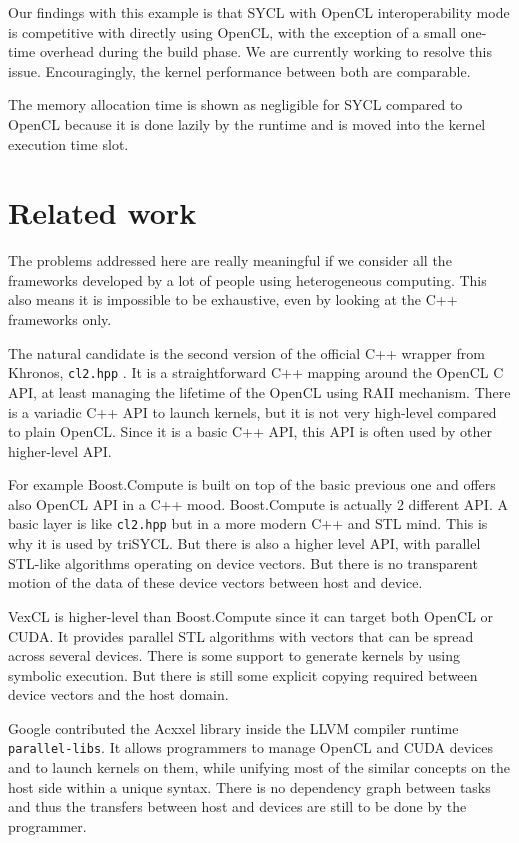 \documentclass[sigplan, review, authordraft]{acmart}
\begin{document}
Our findings with this example is that SYCL with OpenCL interoperability mode is competitive with directly using OpenCL, with the exception of a small one-time overhead during the build phase. We are currently working to resolve this issue. Encouragingly, the kernel performance between both are comparable.

The memory allocation time is shown as negligible for SYCL compared to
OpenCL because it is done lazily by the runtime and is moved into the
kernel execution time slot.


\section{Related work}
\label{sec:related-work}

The problems addressed here are really meaningful if we consider all
the frameworks developed by a lot of people using heterogeneous
computing. This also means it is impossible to be exhaustive, even by
looking at the C++ frameworks only.

The natural candidate is the second version of the official C++
wrapper from Khronos, \texttt{cl2.hpp} \cite{cl2.hpp}. It is a
straightforward C++ mapping around the OpenCL C API, at least managing
the lifetime of the OpenCL using RAII mechanism. There is a variadic
C++ API to launch kernels, but it is not very high-level compared
to plain OpenCL. Since it is a basic C++ API, this API is often
used by other higher-level API.

For example Boost.Compute \cite{Boost.Compute} is built on top of the
basic previous one and offers also OpenCL API in a C++ mood.
Boost.Compute is actually 2 different API. A basic layer is like
\texttt{cl2.hpp} but in a more modern C++ and STL mind. This is why it
is used by triSYCL. But there is also a higher level API, with
parallel STL-like algorithms operating on device vectors. But there is
no transparent motion of the data of these device vectors between host
and device.

VexCL \cite{VexCL} is higher-level than Boost.Compute since it can
target both OpenCL or CUDA. It provides parallel STL algorithms with
vectors that can be spread across several devices. There is some
support to generate kernels by using symbolic execution. But there is
still some explicit copying required between device vectors and the host domain.

Google contributed the Acxxel library \cite{Acxxel-4.0} inside the
LLVM compiler runtime \texttt{parallel-libs}. It allows programmers to manage
OpenCL and CUDA devices and to launch kernels on them, while unifying
most of the similar concepts on the host side within a unique
syntax. There is no dependency graph between tasks and thus the
transfers between host and devices are still to be done by the
programmer.
\end{document}
